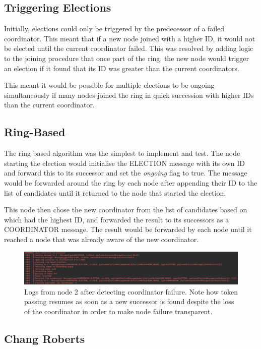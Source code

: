 \documentclass[12pt]{article}
\begin{document}
\subsection{Triggering Elections}

Initially, elections could only be triggered by the predecessor of a failed coordinator. This meant that if a new node joined with a higher ID, it would not be elected until the current coordinator failed. This was resolved by adding logic to the joining procedure that once part of the ring, the new node would trigger an election if it found that its ID was greater than the current coordinators. 

This meant it would be possible for multiple elections to be ongoing simultaneously if many nodes joined the ring in quick succession with higher IDs than the current coordinator. 

\subsection{Ring-Based}

The ring based algorithm was the simplest to implement and test. The node starting the election would initialise the ELECTION message with its own ID and forward this to its successor and set the \emph{ongoing} flag to true. The message would be forwarded around the ring by each node after appending their ID to the list of candidates until it returned to the node that started the election. 

This node then chose the new coordinator from the list of candidates based on which had the highest ID, and forwarded the result to its successors as a COORDINATOR message. The result would be forwarded by each node until it reached a node that was already aware of the new coordinator.

\begin{figure}[!ht]
	\centering
	\includegraphics[width=\linewidth]{images/ringelec}
	\caption{Logs from node 2 after detecting coordinator failure. Note how token passing resumes as soon as a new successor is found despite the loss of the coordinator in order to make node failure transparent.}
	\label{fig:ringbased}
\end{figure}

\subsection{Chang Roberts}
\end{document}
